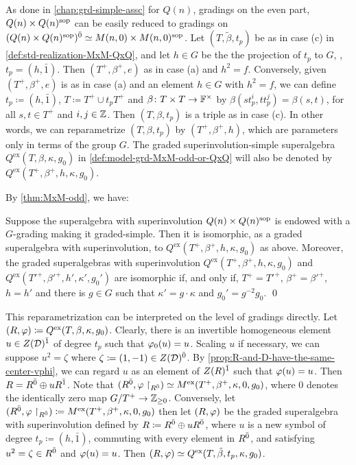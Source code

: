 As done in \cref{chap:grd-simple-assc} for $Q(n)$, gradings on the even part, $Q(n)\times Q(n)^{\mathrm{sop}}$ can be easily reduced to gradings on $(Q(n)\times Q(n)^{\mathrm{sop}})^{\bar0} \simeq M(n, 0) \times M(n, 0) ^{\mathrm{sop}}$. 
Let $(T, \tilde\beta, t_p)$ be as in case (c) in \cref{def:std-realization-MxM-QxQ}, and let $h\in G$ be the the projection of $t_p$ to $G$, \ie, $t_p = (h, \bar 1)$. 
Then $(T^+, \beta^+, e)$ as in case (a) and $h^2 = f$. 
Conversely, given $(T^+, \beta^+, e)$ is as in case (a) and an element $h\in G$ with $h^2 = f$, we can define $t_p \coloneqq (h, \bar 1)$, $T \coloneqq T^+ \cup t_p T^+$ and $\beta\colon T\times T \to \mathbb{F}^\times$ by $\beta(s t_p^i, t t_p^j) = \beta(s,t)$, for all $s, t \in T^+$ and $i, j \in \mathbb{Z}$. 
Then $(T, \beta, t_p)$ is a triple as in case (c). 
In other words, we can reparametrize $(T, \beta, t_p)$ by $(T^+, \beta^+, h)$, which are parameters only in terms of the group $G$. 
The graded superinvolution-simple superalgebra $Q^{\mathrm{ex}} (T, \beta, \kappa, g_0)$ in \cref{def:model-grd-MxM-odd-or-QxQ} will also be denoted by $Q^{\mathrm{ex}} (T^+, \beta^+,  h, \kappa, g_0)$. 

By \cref{thm:MxM-odd}, we have:

\begin{cor}\label{cor:QxQ-reduced-to-MxM}
    Suppose the superalgebra with superinvolution $Q(n) \times Q(n)^{\mathrm{sop}}$ is endowed with a $G$-grading making it graded-simple. 
    Then it is isomorphic, as a graded superalgebra with superinvolution, to $Q^{\mathrm{ex}}(T^+,\beta^+, h, \kappa, g_0)$ as above. 
    Moreover, the graded superalgebras with superinvolution $Q^{\mathrm{ex}} (T^+, \beta^+,  h, \kappa, g_0)$ and $Q^{\mathrm{ex}} (T'^+, \beta'^+,  h', \kappa', g_0')$ are isomorphic if, and only if, $T^+ =T'^+$, $\beta^+ = \beta'^+$, $h = h'$ and there is $g \in G$ such that $\kappa' = g\cdot\kappa$ and $g_0' = g^{-2}g_0$. \qed
\end{cor}

This reparametrization can be interpreted on the level of gradings directly. 
Let $(R, \varphi) \coloneqq Q^{\mathrm{ex}} (T, \beta, \kappa, g_0)$. 
Clearly, there is an invertible homogeneous element $u \in Z(\mathcal{D})^{\bar1}$ of degree $t_p$ such that $\varphi_0(u) = u$. 
Scaling $u$ if necessary, we can suppose $u^2 = \zeta$ where $\zeta \coloneqq (1, -1) \in Z(\mathcal{D})^{\bar0}$. 
By \cref{prop:R-and-D-have-the-same-center-vphi}, we can regard $u$ as an element of $Z(R)^{\bar1}$ such that $\varphi(u) = u$. 
Then $R = R^{\bar0} \oplus u R^{\bar1}$. 
Note that ${(R^{\bar0}, \varphi\restriction_{R^{\bar0}})} \simeq M^{\mathrm{ex}} (T^+, \beta^+, \kappa, 0, g_0)$, where $0$ denotes the identically zero map $G/T^+ \to \mathbb{Z}_{\geq 0}$. 
Conversely, let $(R^{\bar0}, \varphi\restriction_{R^{\bar0}}) \coloneqq M^{\mathrm{ex}} (T^+, \beta^+, \kappa, 0, g_0)$ then let $(R, \varphi)$ be the graded superalgebra with superinvolution defined by $R \coloneqq R^{\bar0} \oplus u R^{\bar0}$, where $u$ is a new symbol of degree $t_p \coloneqq (h, \bar 1)$, commuting with every element in $R^{\bar0}$, and satisfying $u^2 = \zeta \in R^{\bar0}$ and $\varphi(u) = u$. 
Then $(R, \varphi) \simeq Q^{\mathrm{ex}} (T, \tilde\beta, t_p, \kappa, g_0)$. 